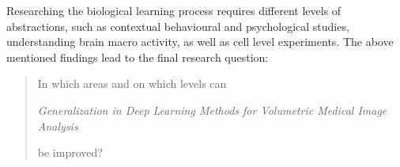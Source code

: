     Researching the biological learning process requires different levels of abstractions, such as contextual behavioural and psychological studies, understanding brain macro activity, as well as cell level experiments.
    The above mentioned findings lead to the final research question:

    \begin{quote}
        \centering \Large
        In which areas and on which levels can

        \noindent \emph{Generalization in Deep Learning Methods for Volumetric Medical Image Analysis}

        \noindent be improved?
    \end{quote}








